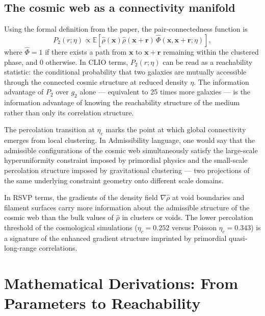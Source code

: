 \documentclass[12pt, oneside]{article}
\begin{document}
\subsection{The cosmic web as a connectivity manifold}

Using the formal definition from the paper, the pair-connectedness function is
\begin{equation}
P_2(r;\eta) \propto \mathbb{E}[\hat{\rho}(\mathbf{x})\hat{\rho}(\mathbf{x}+\mathbf{r})\,\hat{\Phi}(\mathbf{x},\mathbf{x}+\mathbf{r};\eta)],
\end{equation}
where $\hat{\Phi} = 1$ if there exists a path from $\mathbf{x}$ to $\mathbf{x}+\mathbf{r}$ remaining within the clustered phase, and $0$ otherwise. In CLIO terms, $P_2(r;\eta)$ can be read as a reachability statistic: the conditional probability that two galaxies are mutually accessible through the connected cosmic structure at reduced density $\eta$. The information advantage of $P_2$ over $g_2$ alone --- equivalent to 25 times more galaxies --- is the information advantage of knowing the reachability structure of the medium rather than only its correlation structure.

The percolation transition at $\eta_c$ marks the point at which global connectivity emerges from local clustering. In Admissibility language, one would say that the admissible configurations of the cosmic web simultaneously satisfy the large-scale hyperuniformity constraint imposed by primordial physics and the small-scale percolation structure imposed by gravitational clustering --- two projections of the same underlying constraint geometry onto different scale domains.

In RSVP terms, the gradients of the density field $\nabla\hat{\rho}$ at void boundaries and filament surfaces carry more information about the admissible structure of the cosmic web than the bulk values of $\hat{\rho}$ in clusters or voids. The lower percolation threshold of the cosmological simulations ($\eta_c = 0.252$ versus Poisson $\eta_c = 0.343$) is a signature of the enhanced gradient structure imprinted by primordial quasi-long-range correlations.

\section{Mathematical Derivations: From Parameters to Reachability}
\label{sec:math}
\end{document}
